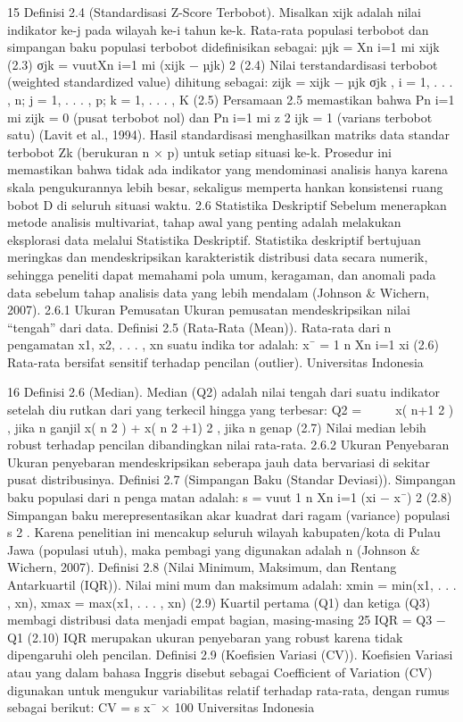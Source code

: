15
Definisi 2.4 (Standardisasi Z-Score Terbobot). Misalkan xijk adalah nilai indikator ke-j
pada wilayah ke-i tahun ke-k. Rata-rata populasi terbobot dan simpangan baku populasi
terbobot didefinisikan sebagai:
µjk =
Xn
i=1
mi xijk (2.3)
σjk =
vuutXn
i=1
mi (xijk − µjk)
2
(2.4)
Nilai terstandardisasi terbobot (weighted standardized value) dihitung sebagai:
zijk =
xijk − µjk
σjk
, i = 1, . . . , n; j = 1, . . . , p; k = 1, . . . , K (2.5)
Persamaan 2.5 memastikan bahwa Pn
i=1 mi zijk = 0 (pusat terbobot nol) dan
Pn
i=1 mi z
2
ijk = 1 (varians terbobot satu) (Lavit et al., 1994).
Hasil standardisasi menghasilkan matriks data standar terbobot Zk (berukuran n × p)
untuk setiap situasi ke-k. Prosedur ini memastikan bahwa tidak ada indikator yang
mendominasi analisis hanya karena skala pengukurannya lebih besar, sekaligus mempertahankan konsistensi ruang bobot D di seluruh situasi waktu.
2.6 Statistika Deskriptif
Sebelum menerapkan metode analisis multivariat, tahap awal yang penting adalah
melakukan eksplorasi data melalui Statistika Deskriptif. Statistika deskriptif bertujuan
meringkas dan mendeskripsikan karakteristik distribusi data secara numerik, sehingga
peneliti dapat memahami pola umum, keragaman, dan anomali pada data sebelum tahap
analisis data yang lebih mendalam (Johnson & Wichern, 2007).
2.6.1 Ukuran Pemusatan
Ukuran pemusatan mendeskripsikan nilai “tengah” dari data.
Definisi 2.5 (Rata-Rata (Mean)). Rata-rata dari n pengamatan x1, x2, . . . , xn suatu indikator adalah:
x¯ =
1
n
Xn
i=1
xi (2.6)
Rata-rata bersifat sensitif terhadap pencilan (outlier).
Universitas Indonesia

16
Definisi 2.6 (Median). Median (Q2) adalah nilai tengah dari suatu indikator setelah diurutkan dari yang terkecil hingga yang terbesar:
Q2 =



x(
n+1
2 )
, jika n ganjil
x(
n
2 )
+ x(
n
2 +1)
2
, jika n genap
(2.7)
Nilai median lebih robust terhadap pencilan dibandingkan nilai rata-rata.
2.6.2 Ukuran Penyebaran
Ukuran penyebaran mendeskripsikan seberapa jauh data bervariasi di sekitar pusat
distribusinya.
Definisi 2.7 (Simpangan Baku (Standar Deviasi)). Simpangan baku populasi dari n pengamatan adalah:
s =
vuut
1
n
Xn
i=1
(xi − x¯)
2
(2.8)
Simpangan baku merepresentasikan akar kuadrat dari ragam (variance) populasi s
2
. Karena
penelitian ini mencakup seluruh wilayah kabupaten/kota di Pulau Jawa (populasi utuh),
maka pembagi yang digunakan adalah n (Johnson & Wichern, 2007).
Definisi 2.8 (Nilai Minimum, Maksimum, dan Rentang Antarkuartil (IQR)). Nilai minimum dan maksimum adalah:
xmin = min(x1, . . . , xn), xmax = max(x1, . . . , xn) (2.9)
Kuartil pertama (Q1) dan ketiga (Q3) membagi distribusi data menjadi empat bagian,
masing-masing 25%
IQR = Q3 − Q1 (2.10)
IQR merupakan ukuran penyebaran yang robust karena tidak dipengaruhi oleh pencilan.
Definisi 2.9 (Koefisien Variasi (CV)). Koefisien Variasi atau yang dalam bahasa Inggris
disebut sebagai Coefficient of Variation (CV) digunakan untuk mengukur variabilitas relatif
terhadap rata-rata, dengan rumus sebagai berikut:
CV =
s
x¯
× 100%
Universitas Indonesia

